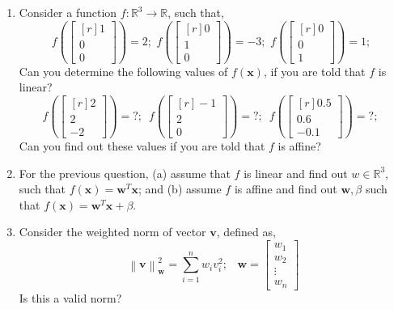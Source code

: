 \begin{enumerate}
    \item Consider a function $f: \mathbb{R}^3 \rightarrow \mathbb{R}$, such that,
    \[ f\left(\begin{bmatrix*}[r]1\\0\\0\end{bmatrix*}\right) = 2; \,\,
    f\left(\begin{bmatrix*}[r]0\\1\\0\end{bmatrix*}\right) = -3; \,\,
    f\left(\begin{bmatrix*}[r]0\\0\\1\end{bmatrix*}\right) = 1; \,\,\]
    Can you determine the following values of $f\left(\mathbf{x}\right)$, if you are told that $f$ is linear?
    \[ f\left(\begin{bmatrix*}[r]2\\2\\-2\end{bmatrix*}\right) = ?; \,\,\,
     f\left(\begin{bmatrix*}[r]-1\\2\\0\end{bmatrix*}\right) = ?; \,\,\,
     f\left(\begin{bmatrix*}[r]0.5\\0.6\\-0.1\end{bmatrix*}\right) = ?; \,\,\,\]
     Can you find out these values if you are told that $f$ is affine?
    
    \item For the previous question, (a) assume that $f$ is linear and find out $w \in \mathbb{R}^3$, such that $f\left(\mathbf{x}\right) = \mathbf{w}^T\mathbf{x}$; and (b) assume $f$ is affine and find out $\mathbf{w}, \beta$ such that $f\left(\mathbf{x}\right) = \mathbf{w}^T\mathbf{x} + \beta$.

    \item Consider the weighted norm of vector $\mathbf{v}$, defined as,
    \[ \left\lVert \mathbf{v}\right\rVert_{\mathbf{w}}^2 = \sum_{i=1}^{n}w_iv_i^2; \,\,\,\,\, \mathbf{w}=\begin{bmatrix*}w_1\\w_2\\\vdots\\w_n\end{bmatrix*} \]
    Is this a valid norm?\\


\end{enumerate}
